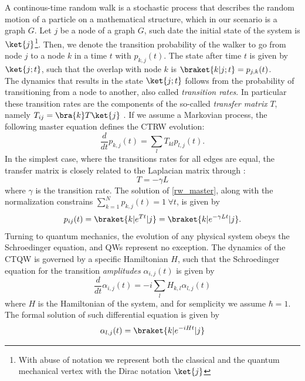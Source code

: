 A continous-time random walk is a stochastic process that describes the random motion of a particle on a mathematical structure, which in our scenario is a graph $G$.
Let $j$ be a node of a graph $G$, such date the initial state of the system is $\ket{j}$\footnote{With abuse of notation we represent both the classical and the quantum mechanical vertex with the Dirac notation $\ket{j}$}. Then, we denote the transition probability of the walker to go from node $j$ to a node $k$ in a time $t$ with $p_{k,j}(t)$. The state after time $t$ is given by $\ket{j;t}$, such that the overlap with node $k$ is $\braket{k|j;t}=p_{j,k}(t)$. \\
The dynamics that results in the state $\ket{j;t}$ follows from the probability of transitioning from a node to another, also called \textit{transition rates}. In particular these transition rates are the components of the so-called \textit{transfer matrix} $T$, namely $T_{ij}= \bra{k}T\ket{j}$ . If we assume a Markovian process, the following master equation defines the CTRW evolution:
\begin{equation}
  \frac{d}{dt}p_{k,j}(t) = \sum_{l}T_{kl}p_{l,j}(t).
  \label{rw_master}
\end{equation}
In the simplest case, where the transitions rates for all edges are equal, the transfer matrix is closely related to the Laplacian matrix through :
\begin{equation}
  T = -\gamma L
\end{equation}
where $\gamma$ is the transition rate. The solution of \cref{rw_master}, along with the normalization constrains $\sum_{k=1}^{N}p_{k,j}(t) = 1 \hspace{3pt} \forall t$, is given by
\begin{equation}
  p_{ij}(t)= \braket{k|e^{Tt}|j} = \braket{k|e^{-\gamma Lt}|j}.
\end{equation}
Turning to quantum mechanics, the evolution of any physical system obeys the Schroedinger equation, and QWs represent no exception. The dynamics of the CTQW is governed by a specific Hamiltonian $H$, such that the Schroedinger equation for the transition \textit{amplitudes} $\alpha_{i,j}(t)$ is given by
\begin{equation}
  \frac{d}{dt}\alpha_{i,j}(t) = -i \sum_{l}H_{k,l}\alpha_{l,j}(t)
\end{equation}
where $H$ is the Hamiltonian of the system, and for semplicity we assume $\hbar = 1$. The formal solution of such differential equation is given by
\begin{equation}
  \alpha_{l,j}(t) = \braket{k|e^{-iHt}|j}
  \label{qw_master}
\end{equation}
